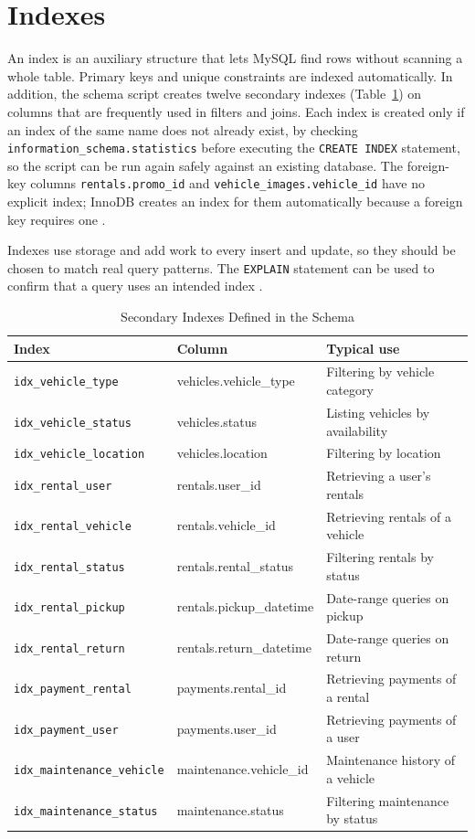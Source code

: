\documentclass[10pt,a4paper]{report}
\newcommand{\col}[1]{\texttt{#1}}
\begin{document}
\section{Indexes}
An index is an auxiliary structure that lets MySQL find rows without scanning a whole table. Primary keys and unique constraints are indexed automatically. In addition, the schema script creates twelve secondary indexes (Table~\ref{tab:indexes}) on columns that are frequently used in filters and joins. Each index is created only if an index of the same name does not already exist, by checking \col{information_schema.statistics} before executing the \col{CREATE INDEX} statement, so the script can be run again safely against an existing database. The foreign-key columns \col{rentals.promo_id} and \col{vehicle_images.vehicle_id} have no explicit index; InnoDB creates an index for them automatically because a foreign key requires one \cite{mysqlfk}.

Indexes use storage and add work to every insert and update, so they should be chosen to match real query patterns. The \col{EXPLAIN} statement can be used to confirm that a query uses an intended index \cite{mysqlindex}.

\begin{table}[htbp]
\centering
\small
\caption{Secondary Indexes Defined in the Schema}
\label{tab:indexes}
\begin{tabular}{@{}lll@{}}
\toprule
\textbf{Index} & \textbf{Column} & \textbf{Typical use} \\
\midrule
\col{idx_vehicle_type} & vehicles.vehicle\_type & Filtering by vehicle category \\
\col{idx_vehicle_status} & vehicles.status & Listing vehicles by availability \\
\col{idx_vehicle_location} & vehicles.location & Filtering by location \\
\col{idx_rental_user} & rentals.user\_id & Retrieving a user's rentals \\
\col{idx_rental_vehicle} & rentals.vehicle\_id & Retrieving rentals of a vehicle \\
\col{idx_rental_status} & rentals.rental\_status & Filtering rentals by status \\
\col{idx_rental_pickup} & rentals.pickup\_datetime & Date-range queries on pickup \\
\col{idx_rental_return} & rentals.return\_datetime & Date-range queries on return \\
\col{idx_payment_rental} & payments.rental\_id & Retrieving payments of a rental \\
\col{idx_payment_user} & payments.user\_id & Retrieving payments of a user \\
\col{idx_maintenance_vehicle} & maintenance.vehicle\_id & Maintenance history of a vehicle \\
\col{idx_maintenance_status} & maintenance.status & Filtering maintenance by status \\
\bottomrule
\end{tabular}
\end{table}
\end{document}
